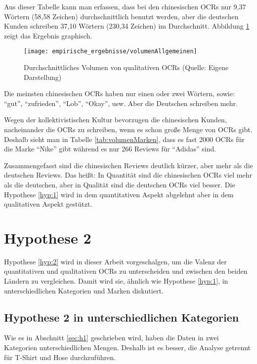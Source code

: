 Aus dieser Tabelle kann man erfassen, dass bei den chinesischen \ac{OCRs} nur 9,37 Wörtern (58,58 Zeichen) durchschnittlich benutzt werden, aber die deutschen Kunden schreiben 37,10 Wörtern (230,34 Zeichen) im Durchschnitt. Abbildung \ref{fig:volumenAllgemeinen} zeigt das Ergebnis graphisch.
\begin{figure}[htb]
\centering
    \texttt{[image: empirische\_ergebnisse/volumenAllgemeinen]} 
    \caption[Durchschnittliches Volumen von qualitativen OCRs]{Durchschnittliches Volumen von qualitativen \ac{OCRs} (Quelle: Eigene Darstellung)}
    \label{fig:volumenAllgemeinen}
\end{figure}

Die meinsten chinesischen \ac{OCRs} haben nur einen oder zwei Wörtern, sowie: ``gut'', ``zufrieden'', ``Lob'', ``Okay'', \ac{usw}. Aber die Deutschen schreiben mehr. %

Wegen der kollektivistischen Kultur bevorzugen die chinesischen Kunden, nacheinander die \ac{OCRs} zu schreiben, wenn es schon große Menge von \ac{OCRs} gibt. Deshalb sieht man in Tabelle \ref{tab:volumenMarken}, dass es fast 2000 \ac{OCRs} für die Marke ``Nike'' gibt während es nur 266 Reviews für ``Adidas'' sind. 

Zusammengefasst sind die chinesischen Reviews deutlich kürzer, aber mehr als die deutschen Reviews. Das heißt: In Quantität sind die chinesischen \ac{OCRs} viel mehr als die deutschen, aber in Qualität sind die deutschen \ac{OCRs} viel besser. Die Hypothese \ref{hyp:1} wird in dem quantitativen Aspekt abgelehnt aber in dem qualitativen Aspekt gestützt.
\section{Hypothese 2}
Hypothese \ref{hyp:2} wird in dieser Arbeit vorgeschalgen, um die Valenz der quantitativen und qualitativen \ac{OCRs} zu unterscheiden und zwischen den beiden Ländern zu vergleichen. Damit wird sie, ähnlich wie Hypothese \ref{hyp:1}, in unterschiedlichen Kategorien und Marken diskutiert.
\subsection{Hypothese 2 in unterschiedlichen Kategorien}
Wie es in Abschnitt \ref{sec:h1} geschrieben wird, haben die Daten in zwei Kategorien unterschiedlichen Mengen. Deshalb ist es besser,  die Analyse getrennt für T-Shirt und Hose durchzuführen.

